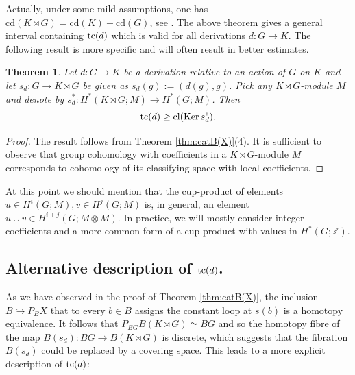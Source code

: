\documentclass[11pt]{amsart}
\theoremstyle{plain}
\newtheorem{theorem}{Theorem}[section]
\theoremstyle{definition}
\newcommand{\ZZ}{{\mathbb{Z}}}
\newcommand{\Ker}{\mathop{\rm Ker}\nolimits}
\newcommand{\cl}{\mathop{\rm cl}\nolimits}
\newcommand{\tc}{\mathop{\rm tc}\nolimits}
\newcommand{\cd}{\mathrm{cd}}
\begin{document}
Actually, under some mild assumptions, one has $\cd(K\rtimes G)=\cd(K)+\cd(G)$, 
see \cite[Thm. 5.5]{Bieri1977}. The above theorem gives a general interval containing
$\tc(d)$ which is valid for all derivations $d\colon G\to K$. The following result is more
specific and will often result in better estimates.

\begin{theorem}\label{thm:coho estimate for tc}
Let $d\colon G\to K$ be a derivation relative to an action of $G$ on $K$ and let 
$s_d\colon G\to K\rtimes G$ be given as $s_d(g):=(d(g),g)$. Pick any $K\rtimes G$-module
$M$ and denote by $s_d^*\colon H^*(K\rtimes G;M)\to H^*(G; M)$. Then
$$\tc(d)\ge \cl(\Ker s_d^*).$$
\end{theorem}
\begin{proof}
The result follows from Theorem \ref{thm:catB(X)}(4). It is sufficient to observe that group 
cohomology with coefficients in a $K\rtimes G$-module $M$ corresponds to cohomology of 
its classifying space with local coefficients.
\end{proof}

At this point we should mention that  the cup-product of elements $u\in H^i(G;M), v\in H^j(G;M)$
is, in general, an element $u\cup v\in H^{i+j}(G;M\otimes M)$. In practice, we will mostly 
consider integer coefficients and a more common form of a cup-product with values in $H^*(G;\ZZ).$

\subsection{Alternative description of $\tc(d)$.} 
As we have observed in the proof of Theorem \ref{thm:catB(X)}, the inclusion 
$B\hookrightarrow P_BX$ that to every $b\in B$ assigns the constant loop at $s(b)$ is a homotopy
equivalence. It follows that $P_{BG}B(K\rtimes G)\simeq BG$ and so the homotopy fibre 
of the map $B(s_d)\colon BG\to B(K\rtimes G)$ is discrete, which suggests that the fibration 
$B(s_d)$ could be replaced by a covering space. This leads to a more explicit description of 
$\tc(d)$:
\end{document}
